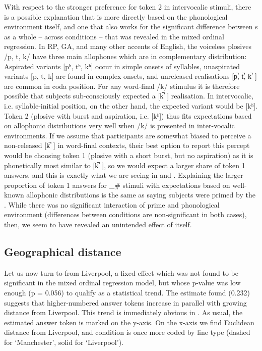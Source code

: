 With respect to the stronger preference for token 2 in intervocalic stimuli, there is a possible explanation that is more directly based on the phonological environment itself, and one that also works for the significant difference between s as a whole -- across  conditions -- that was revealed in the mixed ordinal regression.
In RP, GA, and many other accents of English, the voiceless plosives /p, t, k/ have three main allophones which are in complementary distribution: Aspirated variants [pʰ, tʰ, kʰ] occur in simple onsets of syllables, unaspirated variants [p, t, k] are found in complex onsets, and unreleased realisations [p̚, t̚, k̚~] are common in coda position.
For any word-final /k/ stimulus it is therefore possible that subjects sub-consciously expected a [k̚~] realisation.
In intervocalic, i.e. syllable-initial position, on the other hand, the expected variant would be [kʰ].
Token 2 (plosive with burst and aspiration, i.e. [kʰ]) thus fits expectations based on allophonic distributions very well when /k/ is presented in inter-vocalic environments.
If we assume that participants are somewhat biased to perceive a non-released [k̚~] in word-final contexts, their best option to report this percept would be choosing token 1 (plosive with a short burst, but no aspiration) as it is phonetically most similar to [k̚~], so we would expect a larger share of token 1 answers, and this is exactly what we are seeing in  and .
Explaining the larger proportion of token 1 answers for \_\# stimuli with expectations based on well-known allophonic distributions is the same as saying subjects were primed by the .
While there was no significant interaction of prime and phonological environment (differences between conditions are non-significant in both cases), then, we seem to have revealed an unintended  effect of  itself.

\subsection{Geographical distance}
\label{sec.perc_res.k.geography}

Let us now turn to  from Liverpool, a fixed effect which was not found to be significant in the mixed ordinal regression model, but whose p-value was low enough (p = 0.056) to qualify as a statistical trend.
The estimate found (0.232) suggests that higher-numbered answer tokens increase in parallel with growing distance from Liverpool.
This trend is immediately obvious in .
As usual, the estimated answer token is marked on the y-axis.
On the x-axis we find Euclidean distance from Liverpool, and  condition is once more coded by line type (dashed for `Manchester', solid for `Liverpool').

